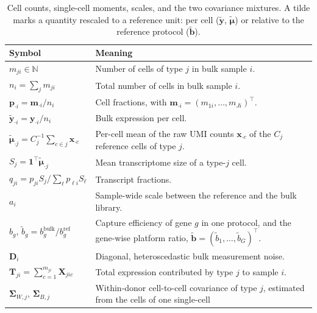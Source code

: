 \documentclass[pdflatex, sn-nature]{sn-jnl}
\theoremstyle{thmstyleone}%
\theoremstyle{thmstyletwo}%
\theoremstyle{thmstylethree}%
\begin{document}
\begin{table}[ht]
  \centering
  \caption{Cell counts, single-cell moments, scales, and the two covariance mixtures.
    A tilde marks a quantity rescaled to a reference unit: per cell (\(\tilde{\boldsymbol{y}}\),
    \(\tilde{\boldsymbol{\mu}}\)) or relative to the reference protocol (\(\tilde{\boldsymbol{b}}\)).}
  \label{tab:notation}
  \begin{tabularx}{\textwidth}{@{}lY@{}}
    \toprule
    Symbol & Meaning \\
    \midrule
    \(m_{ji}\in\mathbb{N}\) &
      Number of cells of type \(j\) in bulk sample \(i\). \\
    \(n_{i}=\sum_{j}m_{ji}\) &
      Total number of cells in bulk sample \(i\). \\
    \(\boldsymbol{p}_{\cdot i}=\boldsymbol{m}_{\cdot i}/n_{i}\) &
      Cell fractions, with \(\boldsymbol{m}_{\cdot i}=(m_{1i},\ldots,m_{Ji})^{\top}\). \\
    \(\tilde{\boldsymbol{y}}_{\cdot i}=\boldsymbol{y}_{\cdot i}/n_{i}\) &
      Bulk expression per cell. \\
    \(\tilde{\boldsymbol{\mu}}_{\cdot j}=C_{j}^{-1}\sum_{c\in j}\boldsymbol{x}_{\cdot c}\) &
      Per-cell mean of the raw UMI counts \(\boldsymbol{x}_{\cdot c}\) of the \(C_{j}\) reference cells of
      type \(j\).\footnotemark[1] \\
    \(S_{j}=\mathbf{1}^{\top}\tilde{\boldsymbol{\mu}}_{\cdot j}\) &
      Mean transcriptome size of a type-\(j\) cell. \\
    \(q_{ji}=p_{ji}S_{j}/\sum_{\ell}p_{\ell i}S_{\ell}\) &
      Transcript fractions. \\
    \(a_{i}\) &
      Sample-wide scale between the reference and the bulk library. \\
    \(b_{g}\), \(\tilde b_{g}=b_{g}^{\mathrm{bulk}}/b_{g}^{\mathrm{ref}}\) &
      Capture efficiency of gene \(g\) in one protocol, and the gene-wise platform ratio,
      \(\tilde{\boldsymbol{b}}=(\tilde b_{1},\ldots,\tilde b_{G})^{\top}\). \\
    \(\boldsymbol{D}_{i}\) &
      Diagonal, heteroscedastic bulk measurement noise. \\
    \(\boldsymbol{T}_{ji}=\sum_{c=1}^{m_{ji}}\boldsymbol{X}_{jic}\) &
      Total expression contributed by type \(j\) to sample \(i\). \\
    \(\boldsymbol{\Sigma}_{W,j}\), \(\boldsymbol{\Sigma}_{B,j}\) &
      Within-donor cell-to-cell covariance of type \(j\), estimated from the cells of one single-cell

\end{tabularx}
\end{table}
\end{document}
